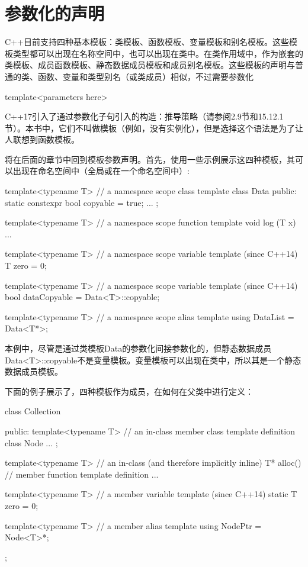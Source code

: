 \section{参数化的声明}

C++目前支持四种基本模板：类模板、函数模板、变量模板和别名模板。这些模板类型都可以出现在名称空间中，也可以出现在类中。在类作用域中，作为嵌套的类模板、成员函数模板、静态数据成员模板和成员别名模板。这些模板的声明与普通的类、函数、变量和类型别名（或类成员）相似，不过需要参数化

\begin{cpp}
template<parameters here>
\end{cpp}

C++17引入了通过参数化子句引入的构造：推导策略（请参阅2.9节和15.12.1节）。本书中，它们不叫做模板（例如，没有实例化），但是选择这个语法是为了让人联想到函数模板。

将在后面的章节中回到模板参数声明。首先，使用一些示例展示这四种模板，其可以出现在命名空间中（全局或在一个命名空间中）:

\begin{cpp}
template<typename T> // a namespace scope class template
class Data {
	public:
	static constexpr bool copyable = true;
	...
};

template<typename T> // a namespace scope function template
void log (T x) {
	...
}

template<typename T> // a namespace scope variable template (since C++14)
T zero = 0;

template<typename T> // a namespace scope variable template (since C++14)
bool dataCopyable = Data<T>::copyable;

template<typename T> // a namespace scope alias template
using DataList = Data<T*>;
\end{cpp}

本例中，尽管是通过类模板Data的参数化间接参数化的，但静态数据成员Data<T>::copyable不是变量模板。变量模板可以出现在类中，所以其是一个静态数据成员模板。

下面的例子展示了，四种模板作为成员，在如何在父类中进行定义：

\begin{cpp}
class Collection {
	public:
	template<typename T> // an in-class member class template definition
	class Node {
		...
	};

	template<typename T> // an in-class (and therefore implicitly inline)
	T* alloc() { // member function template definition
		...
	}

	template<typename T> // a member variable template (since C++14)
	static T zero = 0;
	
	template<typename T> // a member alias template
	using NodePtr = Node<T>*;
};
\end{cpp}

